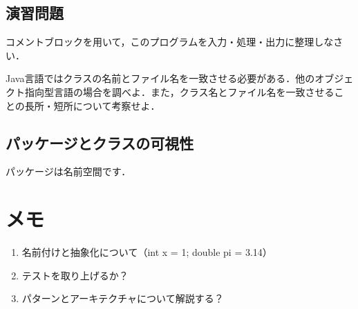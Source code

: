 \documentclass[a4j,papersize]{jsbook}
\begin{document}


\section{演習問題}

\begin{演習}
 コメントブロックを用いて，このプログラムを入力・処理・出力に整理しなさ
 い．
 
\end{演習}

\begin{演習}
 Java言語ではクラスの名前とファイル名を一致させる必要がある．他のオブジェ
 クト指向型言語の場合を調べよ．また，クラス名とファイル名を一致させるこ
 との長所・短所について考察せよ．
\end{演習}
 

\section{パッケージとクラスの可視性}
パッケージは名前空間です．

\chapter{メモ}

\begin{enumerate}
 \item 名前付けと抽象化について（int x = 1; double pi = 3.14）
 \item テストを取り上げるか？
 \item パターンとアーキテクチャについて解説する？
\end{enumerate}
\end{document}
